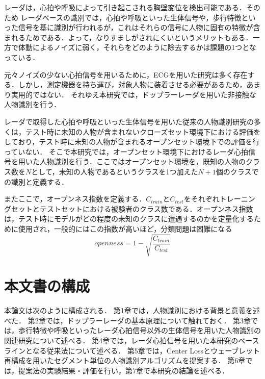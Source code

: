 レーダは，心拍や呼吸によって引き起こされる胸壁変位を検出可能である\cite{paper:Wireless_survey}．そのため
レーダベースの識別では，心拍や呼吸といった生体信号や，歩行特徴といった信号を基に識別が行われるが，これはそれらの信号に人物に固有の特徴が含まれるためである．よって，なりすましがされにくいというメリットもある\cite{paper:HeartSignature}．一方で体動によるノイズに弱く，それらをどのように除去するかは課題の1つとなっている．

元々ノイズの少ない心拍信号を用いるために，ECGを用いた研究は多く存在する\cite{paper:ecg1, paper:ecg2, paper:ensemble}．しかし，測定機器を持ち運び，対象人物に装着させる必要があるため，あまり実用的ではない\cite{paper:Xing}．
それゆえ本研究では，ドップラーレーダを用いた非接触な人物識別を行う．

レーダで取得した心拍や呼吸といった生体信号を用いた従来の人物識別研究の多くは，テスト時に未知の人物が含まれないクローズセット環境下における評価をしており，テスト時に未知の人物が含まれるオープンセット環境下での評価を行っていない．
そこで本研究では，オープンセット環境下におけるレーダ心拍信号を用いた人物識別を行う．ここではオープンセット環境を，既知の人物のクラス数を$N$として，未知の人物であるというクラスを1つ加えた$N+1$個のクラスでの識別と定義する．

またここで，オープンネス指数を定義する．$C_{train}$と$C_{test}$をそれぞれトレーニングセットとテストセットにおける被験者のクラス数である．オープンネス指数は，テスト時にモデルがどの程度の未知のクラスに遭遇するのかを定量化するために使用され，一般的にはこの指数が高いほど，分類問題は困難になる\cite{paper:HeartSignature}
\begin{equation}\label{}
  openness = 1 - \sqrt{\frac{C_{train}}{C_{test}}}
\end{equation}

\section{本文書の構成}
本論文は次のように構成される．
第1章では，人物識別における背景と意義を述べた．
第2章では，ドップラーレーダの基本原理について触れておく．
第3章では，歩行特徴や呼吸といったレーダ心拍信号以外の生体信号を用いた人物識別の関連研究について述べる．
第4章では，レーダ心拍信号を用いた本研究のベースラインとなる従来法について述べる．
第5章では，Center Lossとウェーブレット再構成を用いたセグメント単位の人物識別アルゴリズムを提案する．
第6章では，提案法の実験結果・評価を行い，第7章で本研究の結論を述べる．


